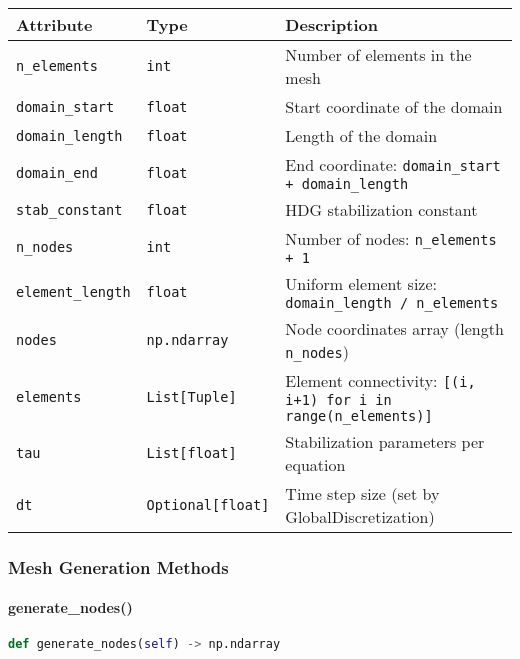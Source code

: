 \begin{longtable}{|p{3.5cm}|p{2.5cm}|p{7cm}|}
\hline
\textbf{Attribute} & \textbf{Type} & \textbf{Description} \\
\hline
\endhead

\texttt{n\_elements} & \texttt{int} & Number of elements in the mesh \\
\hline

\texttt{domain\_start} & \texttt{float} & Start coordinate of the domain \\
\hline

\texttt{domain\_length} & \texttt{float} & Length of the domain \\
\hline

\texttt{domain\_end} & \texttt{float} & End coordinate: \texttt{domain\_start + domain\_length} \\
\hline

\texttt{stab\_constant} & \texttt{float} & HDG stabilization constant \\
\hline

\texttt{n\_nodes} & \texttt{int} & Number of nodes: \texttt{n\_elements + 1} \\
\hline

\texttt{element\_length} & \texttt{float} & Uniform element size: \texttt{domain\_length / n\_elements} \\
\hline

\texttt{nodes} & \texttt{np.ndarray} & Node coordinates array (length \texttt{n\_nodes}) \\
\hline

\texttt{elements} & \texttt{List[Tuple]} & Element connectivity: \texttt{[(i, i+1) for i in range(n\_elements)]} \\
\hline

\texttt{tau} & \texttt{List[float]} & Stabilization parameters per equation \\
\hline

\texttt{dt} & \texttt{Optional[float]} & Time step size (set by GlobalDiscretization) \\
\hline

\end{longtable}

\subsubsection{Mesh Generation Methods}

\paragraph{generate\_nodes()}
\begin{lstlisting}[language=Python, caption=Generate Nodes Method]
def generate_nodes(self) -> np.ndarray
\end{lstlisting}

